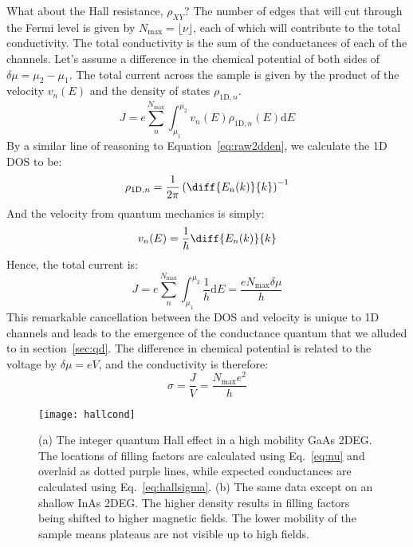What about the Hall resistance, $\rho_{XY}$? The number of edges that will cut through the Fermi level is given by $N_\textrm{max} = \lfloor \nu \rfloor$, each of which
will contribute to the total conductivity. The total conductivity is the sum of the conductances of each of the channels. Let's assume a difference in the
chemical potential of both sides of $\delta \mu = \mu_2 - \mu_1$. The total current across the sample is given by the product of the velocity $v_n(E)$ and the density of states $\rho_{\textrm{1D},n}$.
\begin{equation}
  J = e\sum_n^{N_{\textrm{max}}} \int_{\mu_1}^{\mu_2} v_n(E)\rho_{\textrm{1D},n}(E) \mathrm{d}E
\end{equation}
By a similar line of reasoning to Equation~\ref{eq:raw2dden}, we calculate the 1D DOS to be:
\begin{equation}
  \rho_{\textrm{1D},n} = \frac{1}{2\pi}\left(\diff{E_n(k)}{k}\right)^{-1}
\end{equation}
And the velocity from quantum mechanics is simply:
\begin{equation}
  v_n(E) = \frac{1}{\hbar}\diff{E_n(k)}{k}
\end{equation}
Hence, the total current is:
\begin{equation}
  J = e\sum_n^{N_{\textrm{max}}} \int_{\mu_1}^{\mu_2} \frac{1}{h} \mathrm{d}E = \frac{e N_{\textrm{max}} \delta\mu}{h}
\end{equation}
This remarkable cancellation between the DOS and velocity is unique to 1D channels and leads to the emergence of the conductance quantum that
we alluded to in section~\ref{sec:qd}. The difference in chemical potential is related to the voltage by $\delta \mu = eV$, and the conductivity is therefore:
\begin{equation}
  \sigma = \frac{J}{V} = \frac{N_{\textrm{max}} e^2}{h}
  \label{eq:hallsigma}
\end{equation}

\begin{figure}
  \texttt{[image: hallcond]}
  \caption[Integer quantum Hall effect in GaAs and InAs]
  {\label{fig:hallcond}(a) The integer quantum Hall effect in a high mobility GaAs 2DEG. The locations of filling factors are calculated using Eq.~\ref{eq:nu}
  and overlaid as dotted purple lines, while expected conductances are calculated using Eq.~\ref{eq:hallsigma}. (b) The same data except on an shallow InAs 2DEG.
  The higher density results in filling factors being shifted to higher magnetic fields. The lower mobility of the sample means plateaus are not visible up
  to high fields.}
\end{figure}

